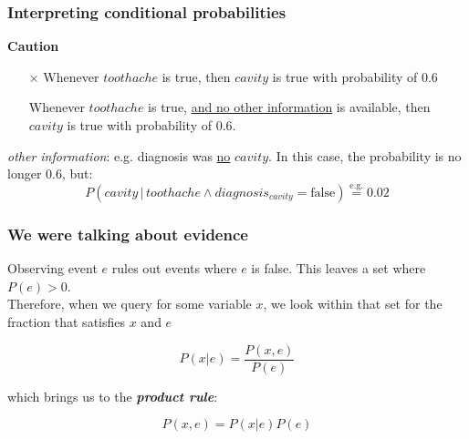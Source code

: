 \begin{frame}\frametitle{Interpreting conditional probabilities}

    
\textbf{Caution}\\
\begin{itemize}
\item[$\times$] Whenever $\mathit{toothache}$ is true, then $\mathit{cavity}$ is true with probability of 0.6
\item[\checkmark] Whenever $\mathit{toothache}$ is true, \underline{and no other information} is available, then $\mathit{cavity}$ is true with probability of 0.6.
\end{itemize}

\textit{other information}: e.g. diagnosis was \underline{no} $\mathit{cavity}$. In this case, the probability is no longer 0.6, but:
\begin{equation}
P(\mathit{cavity} \,|\, \mathit{toothache} \wedge diagnosis_{\mathit{cavity}} = \text{false}) \stackrel{\text{e.g.}}{=} 0.02
\end{equation}

\pause


\end{frame}

\begin{frame}\frametitle{We were talking about evidence}

Observing event $e$ rules out events where $e$ is false. This leaves a set where $P(e)>0$.\\
\svspace{5mm}
Therefore, when we query for some variable $x$,
we look within that set for the fraction that satisfies $x$ and $e$\slidesonly{:}


\begin{equation}
P(x|e) = \frac{P(x,e)}{P(e)}
\end{equation}

which brings us to the \emph{\textbf{product rule}}:

\begin{equation}
P(x,e) = P(x|e) P(e)
\label{eq:productrule}    
\end{equation}

\end{frame}

